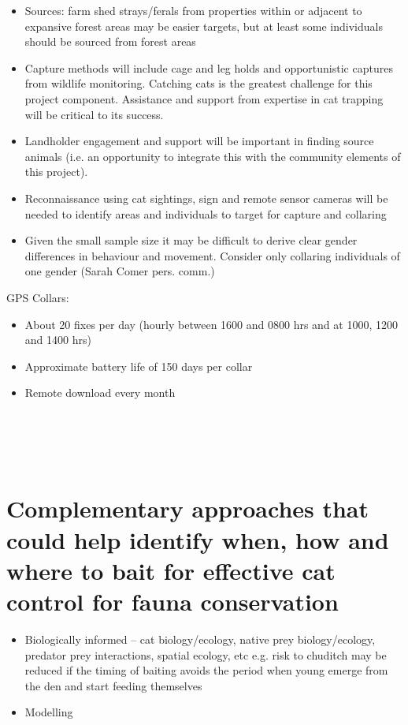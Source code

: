 \documentclass[version=last,
    paper=a4,                               %
    10pt,                                   %
    dvipsnames,
    oneside,                              %
    headings=openany,                       %
    open=any,
    BCOR=7mm,                               %
    DIV=15,     %
]{scrbook}
\begin{document}
\begin{itemize}
\itemsep1pt\parskip0pt
\item
  Sources: farm shed strays/ferals from properties within or adjacent to
  expansive forest areas may be easier targets, but at least some
  individuals should be sourced from forest areas
\item
  Capture methods will include cage and leg holds and opportunistic
  captures from wildlife monitoring. Catching cats is the greatest
  challenge for this project component. Assistance and support from
  expertise in cat trapping will be critical to its success.
\item
  Landholder engagement and support will be important in finding source
  animals (i.e. an opportunity to integrate this with the community
  elements of this project).
\item
  Reconnaissance using cat sightings, sign and remote sensor cameras
  will be needed to identify areas and individuals to target for capture
  and collaring
\item
  Given the small sample size it may be difficult to derive clear gender
  differences in behaviour and movement. Consider only collaring
  individuals of one gender (Sarah Comer pers. comm.)
\end{itemize}

GPS Collars:

\begin{itemize}
\itemsep1pt\parskip0pt
\item
  About 20 fixes per day (hourly between 1600 and 0800 hrs and at 1000,
  1200 and 1400 hrs)
\item
  Approximate battery life of 150 days per collar
\item
  Remote download every month
\end{itemize}

\section{~}

\section{Complementary approaches that could help identify when, how and
where to bait for effective cat control for fauna conservation}

\begin{itemize}
\itemsep1pt\parskip0pt
\item
  Biologically informed -- cat biology/ecology, native prey
  biology/ecology, predator prey interactions, spatial ecology, etc e.g.
  risk to chuditch may be reduced if the timing of baiting avoids the
  period when young emerge from the den and start feeding themselves
\item
  Modelling
\end{itemize}
\end{document}
